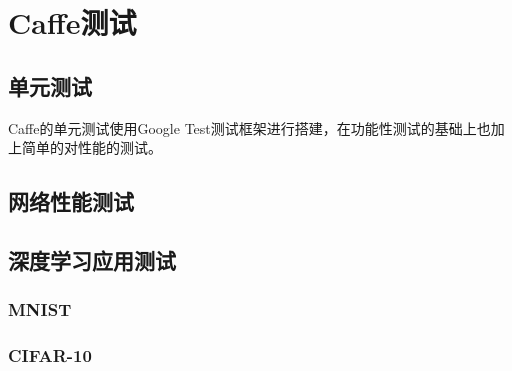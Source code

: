 \section{Caffe测试}

\subsection{单元测试}

Caffe的单元测试使用Google Test测试框架进行搭建，在功能性测试的基础上也加上简单的对性能的测试。

\subsection{网络性能测试}

\subsection{深度学习应用测试}

\subsubsection{MNIST}

\subsubsection{CIFAR-10}


